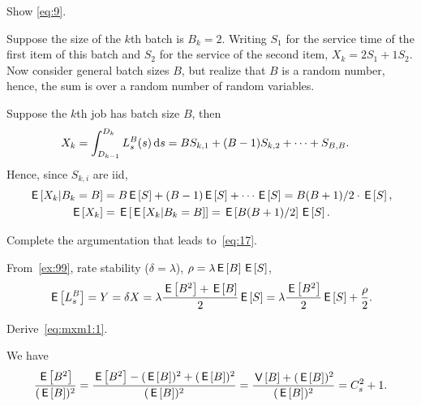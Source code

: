 \begin{exercise}\label{ex:99}
Show
\cref{eq:9}.
\begin{hint}
  Suppose the size of the $k$th batch is $B_k = 2$.
  Writing $S_1$ for the service time of the first item of this batch and $S_2$ for the service of the second item,  $X_k = 2 S_1 + 1 S_2$.
  Now consider general batch sizes $B$, but realize that $B$ is a random number, hence, the sum is  over a random number of random variables.
\end{hint}
\begin{solution}
 Suppose the $k$th job has batch size $B$, then
  \begin{align*}
    X_k &= \int_{D_{k-1}}^{D_k} L_s^B(s) \,\textrm{d}s
    = B S_{k,1} + (B-1)S_{k,2} + \cdots + S_{B, B}.
  \end{align*}
  Hence,  since $S_{k,i}$ are iid,
  \begin{align*}
    \,\mathsf{E}\left[X_k | B_k=B\right] &= B\,\mathsf{E}\left[S\right] + (B-1)\,\mathsf{E}\left[S\right] + \cdots \,\mathsf{E}\left[S\right] = B(B+1)/2 \cdot \,\mathsf{E}\left[S\right], \\
    \,\mathsf{E}\left[X_k\right] & = \,\mathsf{E}\left[\,\mathsf{E}\left[X_k| B_k=B\right]\right] = \,\mathsf{E}\left[B(B+1)/2\right] \,\mathsf{E}\left[S\right].
  \end{align*}
\end{solution}
\end{exercise}


\begin{exercise}\label{ex:100}
Complete the argumentation that leads to~\cref{eq:17}.
\begin{solution}
  From~\cref{ex:99}, rate stability ($\delta = \lambda$), $\rho=\lambda \,\mathsf{E}\left[B\right] \,\mathsf{E}\left[S\right]$,
  \begin{equation*}
    \,\mathsf{E}\left[L_s^B\right] = Y = \delta X = \lambda \frac{\,\mathsf{E}\left[B^2\right]+\,\mathsf{E}\left[B\right]}2 \,\mathsf{E}\left[S\right] =  \lambda \frac{\,\mathsf{E}\left[B^2\right]}{2} \,\mathsf{E}\left[S\right] + \frac \rho 2.
  \end{equation*}
\end{solution}
\end{exercise}


\begin{exercise}\label{q:batch}
Derive~\cref{eq:mxm1:1}.
\begin{solution}
We have
\begin{align*}
\frac{\,\mathsf{E}\left[B^2\right]}{(\,\mathsf{E}\left[B\right])^2}
  =\frac{\,\mathsf{E}\left[B^2\right]-(\,\mathsf{E}\left[B\right])^2 + (\,\mathsf{E}\left[B\right])^2}{(\,\mathsf{E}\left[B\right])^2}
= \frac{\,\mathsf{V}\left[B\right] + (\,\mathsf{E}\left[B\right])^2}{(\,\mathsf{E}\left[B\right])^2}= C_s^2+1.
\end{align*}
\end{solution}
\end{exercise}




